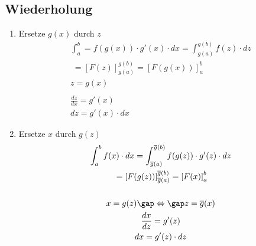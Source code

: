\subsection{Wiederholung}
\begin{enumerate}
  \item Ersetze $g(x)$ durch $z$
  \begin{gather*}
    \int_a^b = f(g(x)) \cdot g'(x) \cdot dx = \int_{g(a)}^{g(b)} f(z) \cdot dz \\
    \;= \left[F(z)\right]_{g(a)}^{g(b)} = \left[F(g(x))\right]_a^b \\
    z = g(x) \\\\
    \frac{dz}{dx} = g'(x) \\
    dz = g'(x) \cdot dx
  \end{gather*}
  \item Ersetze $x$ durch $g(z)$
  \begin{gather*}
    \int_a^b f(x) \cdot dx = \int_{\overline{g}(a)}^{\overline{g}(b)} f(g(z)) \cdot g'(z) \cdot dz \\
    \;= \left[F(g(z))\right]_{\overline{g}(a)}^{\overline{g}(b)} = \left[F(x)\right]_a^b \\\\
    x = g(z) \gap\Leftrightarrow\gap z = \overline{g}(x) \\
    \frac{dx}{dz} = g'(z) \\
    dx = g'(z) \cdot dz
  \end{gather*}
\end{enumerate}
